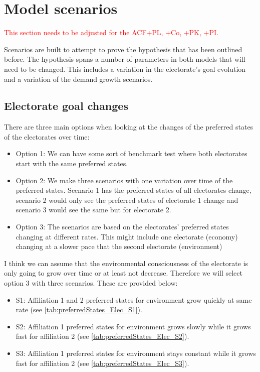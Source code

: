 \documentclass[12pt]{article}
\begin{document}
\section{Model scenarios}
\label{sec:steps}

\textcolor{red}{This section needs to be adjusted for the ACF+PL, +Co, +PK, +PI.}

Scenarios are built to attempt to prove the hypothesis that has been outlined before. The hypothesis spans a number of parameters in both models that will need to be changed. This includes a variation in the electorate's goal evolution and a variation of the demand growth scenarios.

\subsection{Electorate goal changes}

There are three main options when looking at the changes of the preferred states of the electorates over time:

\begin{itemize}
\item Option 1: We can have some sort of benchmark test where both electorates start with the same preferred states.
\item Option 2: We make three scenarios with one variation over time of the preferred states. Scenario 1 has the preferred states of all electorates change, scenario 2 would only see the preferred states of electorate 1 change and scenario 3 would see the same but for electorate 2.
\item Option 3: The scenarios are based on the electorates' preferred states changing at different rates. This might include one electorate (economy) changing at a slower pace that the second electorate (environment)
\end{itemize}

I think we can assume that the environmental consciousness of the electorate is only going to grow over time or at least not decrease. Therefore we will select option 3 with three scenarios. These are provided below:

\begin{itemize}
\item S1: Affiliation 1 and 2 preferred states for environment grow quickly at same rate (see \autoref{tab:preferredStates_Elec_S1}).
\item S2: Affiliation 1 preferred states for environment grows slowly while it grows fast for affiliation 2 (see \autoref{tab:preferredStates_Elec_S2}).
\item S3: Affiliation 1 preferred states for environment stays constant while it grows fast for affiliation 2 (see \autoref{tab:preferredStates_Elec_S3}).
\end{itemize}
\end{document}

